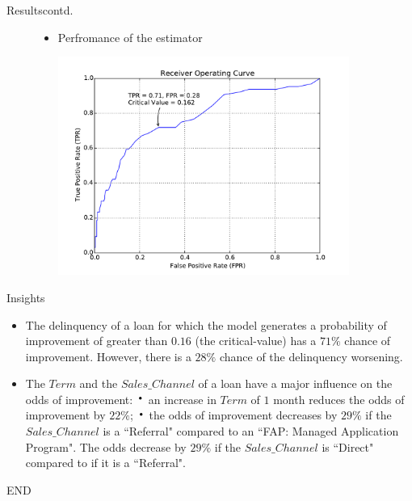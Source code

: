 \documentclass{beamer}
\newcommand*{\LargerCdot}{\raisebox{-0.25ex}{\scalebox{2.3}{$\cdot$}}}
\begin{document}
\begin{frame}{Results}{contd.}
	\begin{figure}
	\vspace{-0.15 in}
		\begin{itemize}\item{Perfromance of the estimator} \newline\vspace{-0 in}
			\begin{center}
				\vspace*{-0.21 in}
				\hspace*{-1in}
				\includegraphics[width=0.9\textwidth]{ROC.pdf} 
			\end{center}
		\end{itemize}
	\end{figure}
		\vspace{-0.in}
\end{frame}

\begin{frame}{Insights}{}
	\begin{itemize}		
		\item{The delinquency of a loan for which the model generates a probability of improvement of greater than $0.16$ (the critical-value) has a $71\%$ chance of improvement. However, there is a $28\%$ chance of the delinquency worsening.} \newline\vspace{0 in}
		\item{The $Term$ and the $Sales\_Channel$ of a loan have a major influence on the odds of improvement:} \newline\vspace{0 in}
		{\hspace{-0.06in}}{$\LargerCdot$ an increase in $Term$ of $1$ month reduces the odds of improvement by $22\%$;}\newline
		{$\LargerCdot$ the odds of improvement decreases by $29\%$ if the $Sales\_Channel$ is a ``Referral" compared to an ``FAP: Managed Application Program". The odds decrease by $29\%$ if the $Sales\_Channel$ is  ``Direct" compared to if it is a ``Referral".}
		\end{itemize}
\end{frame}


\begin{frame}{}{}
	\begin{center}
        		\Large{END}          
      \end{center}
\end{frame}
\end{document}
